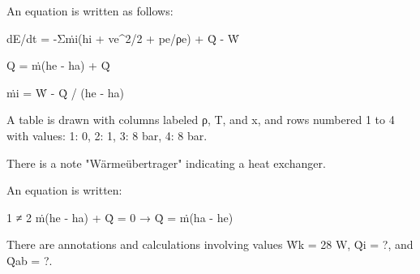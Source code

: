 An equation is written as follows: 

dE/dt = -Σṁi(hi + ve^2/2 + pe/ρe) + Q̇ - Ẇ

Q = ṁ(he - ha) + Q̇

ṁi = Ẇ - Q̇ / (he - ha)

A table is drawn with columns labeled ρ, T, and x, and rows numbered 1 to 4 with values: 
1: 0, 
2: 1, 
3: 8 bar, 
4: 8 bar.

There is a note "Wärmeübertrager" indicating a heat exchanger.

An equation is written: 

1 ≠ 2 ṁ(he - ha) + Q̇ = 0 → Q̇ = ṁ(ha - he)

There are annotations and calculations involving values Ẇk = 28 W, Q̇i = ?, and Q̇ab = ?.